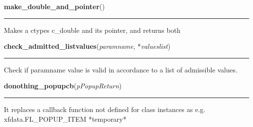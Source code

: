     \label{xformslib:library:make_double_and_pointer}

    \vspace{0.5ex}

\hspace{.8\funcindent}\begin{boxedminipage}{\funcwidth}

    \raggedright \textbf{make\_double\_and\_pointer}()

    \vspace{-1.5ex}

    \rule{\textwidth}{0.5\fboxrule}
\setlength{\parskip}{2ex}
    Makes a ctypes c\_double and its pointer, and returns both

\setlength{\parskip}{1ex}
    \end{boxedminipage}

    \label{xformslib:library:check_admitted_listvalues}

    \vspace{0.5ex}

\hspace{.8\funcindent}\begin{boxedminipage}{\funcwidth}

    \raggedright \textbf{check\_admitted\_listvalues}(\textit{paramname}, *\textit{valueslist})

    \vspace{-1.5ex}

    \rule{\textwidth}{0.5\fboxrule}
\setlength{\parskip}{2ex}
    Check if paramname value is valid in accordance to a list of admissible
    values.

\setlength{\parskip}{1ex}
    \end{boxedminipage}

    \label{xformslib:library:donothing_popupcb}

    \vspace{0.5ex}

\hspace{.8\funcindent}\begin{boxedminipage}{\funcwidth}

    \raggedright \textbf{donothing\_popupcb}(\textit{pPopupReturn})

    \vspace{-1.5ex}

    \rule{\textwidth}{0.5\fboxrule}
\setlength{\parskip}{2ex}
    It replaces a callback function not defined for class instances as e.g.
    xfdata.FL\_POPUP\_ITEM    *temporary*

\setlength{\parskip}{1ex}
    \end{boxedminipage}

